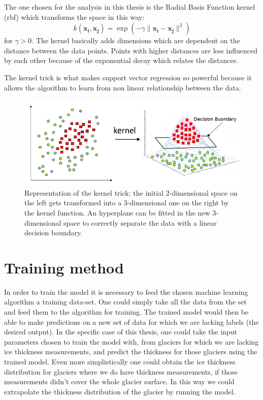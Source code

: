 The one chosen for the analysis in this thesis is the Radial Basis Function kernel (rbf) which transforms the space in this way:
\begin{equation}\label{eq:rbf}
k({\mathbf {x_{i}}},{\mathbf {x_{j}}})=\exp(-\gamma \|\mathbf {x_{i}}-\mathbf {x_{j}}\|^{2})
\end{equation}
for $\gamma >0$.
The kernel basically adds dimensions which are dependent on the distance between the data points. Points with higher distances are less influenced by each other because of the exponential decay which relates the distances.

The kernel trick is what makes support vector regression so powerful because it allows the algorithm to learn from non linear relationship between the data.

\begin{figure}[!tp]
	\centering		  
	\includegraphics[width=1.\textwidth]{figures/kernel_trick.png}
	\caption{Representation of the kernel trick: the initial 2-dimensional space on the left gets transformed into a 3-dimensional one on the right by the kernel function. An hyperplane can be fitted in the new 3-dimensional space to correctly separate the data with a linear decision boundary.}
	\label{fig:kernel}
\end{figure}


\section{Training method}\label{training}
In order to train the model it is necessary to feed the chosen machine learning algorithm a training data-set. One could simply take all the data from the set and feed them to the algorithm for training. The trained model would then be able to make predictions on a new set of data for which we are lacking labels (the desired output). In the specific case of this thesis, one could take the input parameters chosen to train the model with, from glaciers for which we are lacking ice thickness measurements, and predict the thickness for those glaciers using the trained model. Even more simplistically one could obtain the ice thickness distribution for glaciers where we do have thickness measurements, if those measurements didn't cover the whole glacier surface. In this way we could extrapolate the thickness distribution of the glacier by running the model.

